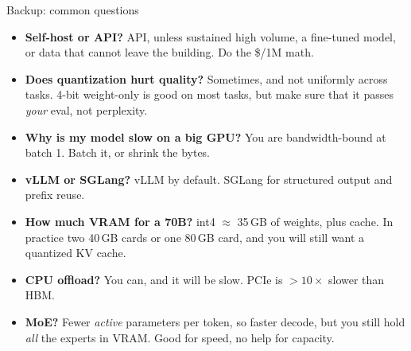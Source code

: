 \documentclass[aspectratio=169,10pt]{beamer}
\begin{document}
\begin{frame}{Backup: common questions}
  \small
  \begin{itemize}
    \item \textbf{Self-host or API?} API, unless sustained high volume, a
          fine-tuned model, or data that cannot leave the building. Do the
          \$/1M math.
    \item \textbf{Does quantization hurt quality?} Sometimes, and not
          uniformly across tasks. 4-bit weight-only is good on most tasks, but make sure
          that it passes \emph{your} eval, not perplexity.
    \item \textbf{Why is my model slow on a big GPU?} You are bandwidth-bound
          at batch 1. Batch it, or shrink the bytes.
    \item \textbf{vLLM or SGLang?} vLLM by default. SGLang for structured
          output and prefix reuse.
    \item \textbf{How much VRAM for a 70B?} int4 $\approx$ 35\,GB of weights,
          plus cache. In practice two 40\,GB cards or one 80\,GB card, and
          you will still want a quantized KV cache.
    \item \textbf{CPU offload?} You can, and it will be slow. PCIe is $>10\times$
          slower than HBM.
    \item \textbf{MoE?} Fewer \emph{active} parameters per token, so faster
          decode, but you still hold \emph{all} the experts in VRAM. Good
          for speed, no help for capacity.
  \end{itemize}
\end{frame}
\end{document}
